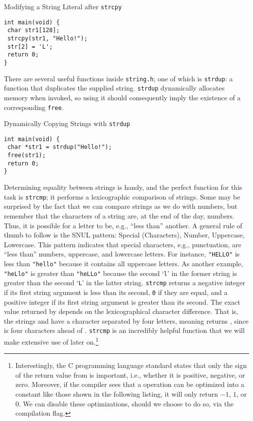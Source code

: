 \begin{cl}[main.c]{Modifying a String Literal after \texttt{strcpy}}\begin{lstlisting}[language=MyC]
int main(void) {
 char str1[128];
 strcpy(str1, "Hello!");
 str[2] = 'L';
 return 0;
}
\end{lstlisting}\end{cl}

There are several useful functions inside \texttt{string.h}; one of which is \texttt{strdup}: a function that duplicates the supplied string. \texttt{strdup} dynamically allocates memory when invoked, so using it should consequently imply the existence of a corresponding \texttt{free}.

\begin{cl}[main.c]{Dynamically Copying Strings with \texttt{strdup}}\begin{lstlisting}[language=MyC]
int main(void) {
 char *str1 = strdup("Hello!");
 free(str1);
 return 0;
}
\end{lstlisting}\end{cl}

Determining equality between strings is handy, and the perfect function for this task is \texttt{strcmp}; it performs a lexicographic comparison of strings. Some may be surprised by the fact that we can compare strings as we do with numbers, but remember that the characters of a string are, at the end of the day, numbers. Thus, it is possible for a letter to be, e.g., ``less than'' another. A general rule of thumb to follow is the SNUL pattern: Special (Characters), Number, Uppercase, Lowercase. This pattern indicates that special characters, e.g., punctuation, are ``less than'' numbers, uppercase, and lowercase letters. For instance, \texttt{"HELLO"} is less than \texttt{"hello"} because it contains all uppercase letters. As another example, \texttt{"heLlo"} is greater than \texttt{"heLLo"} because the second `\texttt{l}' in the former string is greater than the second `\texttt{L}' in the latter string. \texttt{strcmp} returns a negative integer if its first string argument is less than its second, \texttt{0} if they are equal, and a positive integer if its first string argument is greater than its second. The exact value returned by  depends on the lexicographical character difference. That is, the strings  and  have a character separated by four letters, meaning  returns , since  is four characters ahead of . \texttt{strcmp} is an incredibly helpful function that we will make extensive use of later on.\footnote{Interestingly, the C programming language standard states that only the sign of the return value from  is important, i.e., whether it is positive, negative, or zero. Moreover, if the compiler sees that a  operation can be optimized into a constant like those shown in the following listing, it will only return $-1$, $1$, or $0$. We can disable these optimizations, should we choose to do so, via the  compilation flag.}

